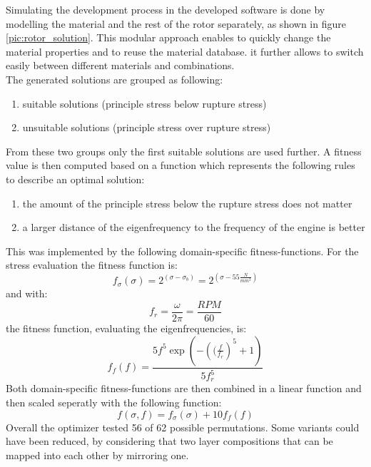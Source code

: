 Simulating the development process in the developed software is done by 
modelling the material and the rest of the rotor separately, as shown in figure \ref{pic:rotor_solution}.
This modular approach enables to quickly change the material properties and to reuse the material database.
it further allows to switch easily between different materials and combinations.\\
The generated solutions are grouped as following:
\begin{enumerate}
    \item suitable solutions (principle stress below rupture stress)
    \item unsuitable solutions (principle stress over rupture stress)
\end{enumerate}
From these two groups only the first suitable solutions are used further.
A fitness value is then computed based on a function which represents the following rules to describe an optimal solution:
\begin{enumerate}
    \item the amount of the principle stress below the rupture stress does not matter
    \item a larger distance of the eigenfrequency to the frequency of the engine is better
\end{enumerate}
This was implemented by the following domain-specific fitness-functions.
For the stress evaluation the fitness function is:
\begin{equation}
    \label{eq:fitness_stress}
    f_{\sigma}(\sigma)=2^{(\sigma-\sigma_{b})}=2^{(\sigma-55\frac{N}{mm^2})}
\end{equation}
and with:
\begin{equation}
    \label{eq:rotation_frequency}
    f_{r}=\frac{\omega}{2\pi}=\frac{RPM}{60}
\end{equation}
the fitness function, evaluating the eigenfrequencies, is:
\begin{equation}
    \label{eq:fitness_freq}
    f_{f}(f)=\frac{5 f^5 \exp{\left(-\left((\frac{f}{f_r}\right)^5 + 1\right)}}{5 f_r^5}
\end{equation}
Both domain-specific fitness-functions are then combined in a linear function 
and then scaled seperatly with the following function:
\begin{equation}
    \label{eq:fitness_final}
    f(\sigma,f)=f_{\sigma}(\sigma)+10f_{f}(f)
\end{equation}
Overall the optimizer tested 56 of 62 possible permutations.
Some variants could have been reduced, by considering that two layer compositions that can be mapped into each other by mirroring one.

